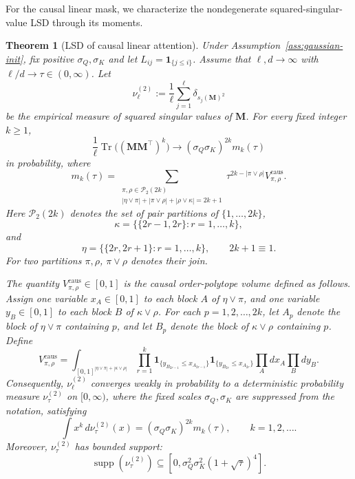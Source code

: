 \documentclass{article}
\newcommand{\one}{\mathbf{1}}
\newcommand{\bM}{\mathbf{M}}
\newtheorem{theorem}{Theorem}
\theoremstyle{definition}
\theoremstyle{remark}
\begin{document}
For the causal linear mask, we characterize the nondegenerate
squared-singular-value LSD through its moments.

\begin{theorem}[LSD of causal linear attention]\label{thm:init-singular-causal-mask}
Under Assumption~\ref{ass:gaussian-init}, fix positive $\sigma_Q,\sigma_K$ and
let $L_{ij}=\one_{\{j\leq i\}}$.  Assume that $\ell,d\to\infty$ with
$\ell/d\to\tau\in(0,\infty)$.
Let
\[
    \nu_{\ell}^{(2)}
    :=
    \frac1\ell\sum_{j=1}^{\ell}\delta_{s_j(\bM)^2}
\]
be the empirical measure of squared singular values of $\bM$.  For every fixed
integer $k\ge 1$,
\[
\frac1\ell\operatorname{Tr}\bigl((\bM\bM^\top)^k\bigr)
\longrightarrow
(\sigma_Q\sigma_K)^{2k}m_k(\tau)
\]
in probability, where
\[
    m_k(\tau)
    =
    \sum_{\substack{\pi,\rho\in\mathcal P_2(2k)\\
    |\eta\vee\pi|+|\pi\vee\rho|+|\rho\vee\kappa|=2k+1}}
    \tau^{2k-|\pi\vee\rho|}V_{\pi,\rho}^{\mathrm{caus}}.
\]
Here $\mathcal P_2(2k)$ denotes the set of pair partitions of
$\{1,\ldots,2k\}$,
\[
\kappa=\bigl\{\{2r-1,2r\}:r=1,\ldots,k\bigr\},
\]
and
\[
\eta=\bigl\{\{2r,2r+1\}:r=1,\ldots,k\bigr\},
\qquad 2k+1\equiv 1.
\]
For two partitions $\pi,\rho$, $\pi\vee\rho$ denotes their join.

The quantity $V_{\pi,\rho}^{\mathrm{caus}}\in[0,1]$ is the causal order-polytope
volume defined as follows.  Assign one variable $x_A\in[0,1]$ to each block $A$
of $\eta\vee\pi$, and one variable $y_B\in[0,1]$ to each block $B$ of
$\kappa\vee\rho$.  For each $p=1,2,\ldots,2k$, let $A_p$ denote the block of
$\eta\vee\pi$ containing $p$, and let $B_p$ denote the block of $\kappa\vee\rho$
containing $p$.  Define
\[
V_{\pi,\rho}^{\mathrm{caus}}
=
\int_{[0,1]^{|\eta\vee\pi|+|\kappa\vee\rho|}}
\prod_{r=1}^k
\one_{\{y_{B_{2r-1}}\le x_{A_{2r-1}}\}}
\one_{\{y_{B_{2r}}\le x_{A_{2r}}\}}
\prod_A dx_A\prod_B dy_B.
\]
Consequently, $\nu_{\ell}^{(2)}$ converges weakly in probability to a deterministic
probability measure $\nu_{\tau}^{(2)}$ on $[0,\infty)$, where the fixed scales
$\sigma_Q,\sigma_K$ are suppressed from the notation, satisfying
\[
\int x^k\,d\nu_{\tau}^{(2)}(x)
=
(\sigma_Q\sigma_K)^{2k}m_k(\tau),
\qquad k=1,2,\ldots.
\]
Moreover, $\nu_{\tau}^{(2)}$ has bounded support:
\[
\operatorname{supp}(\nu_{\tau}^{(2)})
\subseteq
\left[0,\sigma_Q^2\sigma_K^2(1+\sqrt\tau)^4\right].
\]
\end{theorem}
\end{document}
